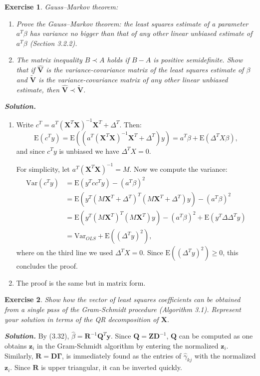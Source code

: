 \documentclass[12pt]{article}
\def\bQ{\textbf{Q}}
\def\var{\text{Var}}
\def\bz{\textbf{z}}
\def\bX{\textbf{X}}
\def\by{\textbf{y}}
\def\bV{\textbf{V}}
\def\bR{\textbf{R}}
\def\bQ{\textbf{Q}}
\def\bD{\textbf{D}}
\def\bV{\textbf{V}}
\def\bZ{\textbf{Z}}
\def\bGamma{\mathbf{\Gamma}}
\def\E{\text{E}}
\newtheorem{exercise}{Exercise}[section]
\newenvironment{solution}[1][\it{Solution}]{\textbf{#1. } }{\vspace{.5cm}}
\begin{document}
\begin{exercise}Gauss–Markov theorem:
\begin{enumerate}
\item[(a)] Prove the Gauss–Markov theorem: the least squares estimate of a
parameter $a^T \beta$ has variance no bigger than that of any other linear
unbiased estimate of $a^T \beta$ (Section 3.2.2).
\item[(b)] The matrix inequality $B \prec A$ holds if $B-A$ is positive semidefinite. Show that if $\hat{\bV}$ is the variance-covariance matrix of the least squares estimate of $\beta$ and $\tilde{\bV}$ is the variance-covariance matrix of any other
linear unbiased estimate, then $\hat{\bV} \prec \tilde{\bV}$.
\end{enumerate}
\end{exercise}

\begin{solution}
    \begin{enumerate}
    \item [(a)] Write $c^T = a^T (\bX^T \bX)^{-1} \bX^T + \Delta^T$. Then:
    $$\E(c^T y) = \E((a^T (\bX^T \bX)^{-1} \bX^T + \Delta^T)y) = a^T \beta + \E(\Delta^T X \beta),$$
    and since $c^T y$ is unbiased we have $\Delta^T X = 0$.

    For simplicity, let $a^T (\bX^T \bX)^{-1} = M$. Now we compute the variance:
    $$\begin{aligned} \var(c^Ty) &= \E(y^T c c^T y) - (a^T\beta)^2 \\
    &= \E(y^T (M\bX^T + \Delta^T)^T (M\bX^T + \Delta^T) y) - (a^T\beta)^2 \\
    &= \E(y^T(M\bX^T)^T(M\bX^T)y) - (a^T\beta)^2 + \E(y^T\Delta\Delta^Ty) \\
    &= \var_{OLS} + \E((\Delta^T y)^2),
    \end{aligned}$$
    where on the third line we used $\Delta^T X  = 0$. Since $\E((\Delta^T y)^2) \geq 0$, this concludes the proof.

    \item [(b)] The proof is the same but in matrix form.
    \end{enumerate}
\end{solution}

\begin{exercise} Show how the vector of least squares coefficients can be obtained from a single pass of the Gram-Schmidt procedure (Algorithm 3.1). Represent your solution in terms of the QR decomposition of $\bX$.
\end{exercise}
\begin{solution}
    By (3.32), $\hat{\beta} = \bR^{-1}\bQ^T \by$. Since $\bQ = \bZ \bD^{-1}$, $\bQ$ can be computed as one obtains $\bz_i$ in the Gram-Schmidt algorithm by entering the normalized $\bz_i$. Similarly, $\bR = \bD \bGamma$, is immediately found as the entries of $\hat{\gamma}_{kj}$ with the normalized $\bz_i$. Since $\bR$ is upper triangular, it can be inverted quickly.
\end{solution}
\end{document}
